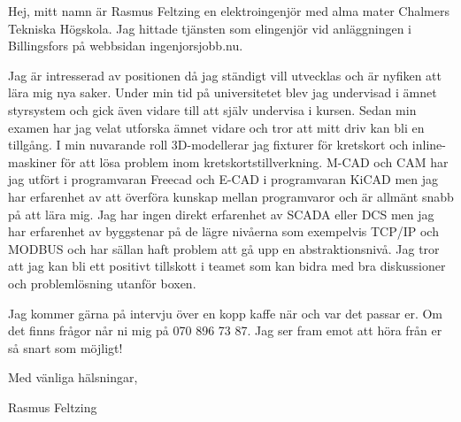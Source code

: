 \documentclass{article}
\begin{document}
Hej, mitt namn är Rasmus Feltzing en elektroingenjör med alma mater Chalmers Tekniska Högskola. Jag hittade tjänsten som elingenjör vid anläggningen i Billingsfors på webbsidan ingenjorsjobb.nu. 


Jag är intresserad av positionen då jag ständigt vill utvecklas och är nyfiken att lära mig nya saker. Under min tid på universitetet blev jag undervisad i ämnet styrsystem och gick även vidare till att själv undervisa i kursen. Sedan min examen har jag velat utforska ämnet vidare och tror att mitt driv kan bli en tillgång. I min nuvarande roll 3D-modellerar jag fixturer för kretskort och inline-maskiner för att lösa problem inom kretskortstillverkning. M-CAD och CAM har jag utfört i programvaran Freecad och E-CAD i programvaran KiCAD men jag har erfarenhet av att överföra kunskap mellan programvaror och är allmänt snabb på att lära mig. Jag har ingen direkt erfarenhet av SCADA eller DCS men jag har erfarenhet av byggstenar på de lägre nivåerna som exempelvis TCP/IP och MODBUS och har sällan haft problem att gå upp en abstraktionsnivå. Jag tror att jag kan bli ett positivt tillskott i teamet som kan bidra med bra diskussioner och problemlösning utanför boxen.


Jag kommer gärna på intervju över en kopp kaffe när och var det passar er. Om det finns frågor når ni mig på 070 896 73 87. Jag ser fram emot att höra från er så snart som möjligt! 

\bigskip %

Med vänliga hälsningar,

\vspace{50pt} %

Rasmus Feltzing
\end{document}
